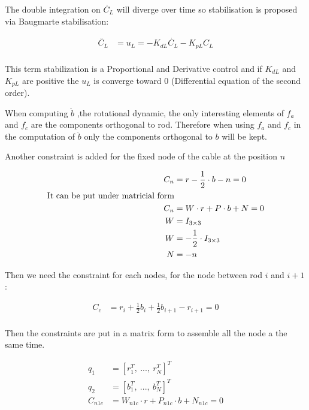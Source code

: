 \documentclass[twoside,12pt]{report} %
\begin{document}
The double integration on $\ddot{C_L}$ will diverge over time so stabilisation is proposed via Baugmarte stabilisation:

\begin{align}
\ddot{C_L} &= u_L = -K_{dL} \dot{C_L} - K_{pL} C_L \\
\end{align}

This term stabilization is a Proportional and Derivative control and if $K_{dL}$ and $K_{pL}$ are positive the $u_L$ is converge toward 0 (Differential equation of the second order).

When computing $\ddot{b}$ ,the rotational dynamic, the only interesting elements of $f_a$ and $f_c$ are the components orthogonal to rod. Therefore when using  $f_a$ and $f_c$ in the computation of $\ddot{b}$  only the components orthogonal to $b$ will be kept.

Another constraint is added for the fixed node of the cable at the position $n$

\begin{align}
C_n &= r -\frac{1}{2} \cdot b - n = 0 \nonumber \\
\textnormal{It can be put under matricial form} \nonumber \\
C_n &= W \cdot r + P\cdot b + N = 0 \nonumber  \\
W &= I_{3\times3} \nonumber \\
W &= -\frac{1}{2} \cdot I_{3\times3} \nonumber \\
N &= -n \\
\end{align}

Then we need the constraint for each nodes, for the node between rod $i$ and $i+1$:

\begin{align}
C_c &=  r_i+ \frac{1}{2}  b_i +\frac{1}{2}  b_{i+1} - r_{i+1} =0 \\
\end{align}

Then the constraints are put in a matrix form to assemble all the node a the same time.

\begin{align}
q_1 &= [ r_1^T,~ ..., ~ r_N^T ]^T \nonumber \\
q_2 &= [ b_1^T,~ ..., ~ b_N^T ]^T \nonumber \\
C_{n1c} &= W_{n1c} \cdot r + P_{n1c}\cdot b + N_{n1c} = 0
\end{align}


\end{document}

